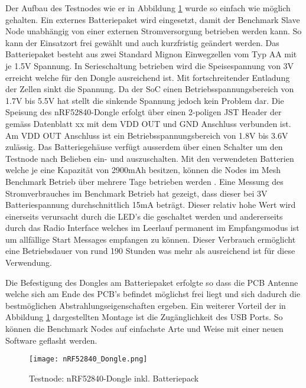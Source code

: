 Der Aufbau des Testnodes wie er in Abbildung \ref{fig:TestnodenRF52840-DongleinklBatteriepack} wurde so einfach wie möglich gehalten. Ein externes Batteriepaket wird eingesetzt, damit der Benchmark Slave Node unabhängig von einer externen Stromversorgung betrieben werden kann. So kann der Einsatzort frei gewählt und auch kurzfristig geändert werden.
Das Batteriepaket besteht aus zwei Standard Mignon Einwegzellen vom Typ AA mit je 1.5V Spannung. In Serieschaltung betrieben wird die Speisespannung von 3V erreicht welche für den Dongle ausreichend ist. Mit fortschreitender Entladung der Zellen sinkt die Spannung. Da der SoC einen Betriebsspannungsbereich von 1.7V bis 5.5V hat stellt die sinkende Spannung jedoch kein Problem dar.
Die Speisung des nRF52840-Dongle erfolgt über einen 2-poligen JST Header der gemäss Datenblatt xx mit dem VDD OUT und GND Anschluss verbunden ist. Am VDD OUT Anschluss ist ein Betriebsspannungsbereich von 1.8V bis 3.6V zulässig.
Das Batteriegehäuse verfügt ausserdem über einen Schalter um den Testnode nach Belieben ein- und auszuschalten.
Mit den verwendeten Batterien welche je eine Kapazität von 2900mAh besitzen, können die Nodes im Mesh Benchmark Betrieb über mehrere Tage betrieben werden \cite{distrelec_schweiz_ag_rnd_2020} .
Eine Messung des Stromverbrauches im Benchmark Betrieb hat gezeigt, dass dieser bei 3V Batteriespannung durchschnittlich 15mA beträgt. Dieser relativ hohe Wert wird einerseits verursacht durch die LED's die geschaltet werden und andererseits durch das Radio Interface welches im Leerlauf permanent im Empfangsmodus ist um allfällige Start Messages empfangen zu können. 
Dieser Verbrauch ermöglicht eine Betriebsdauer von rund 190 Stunden was mehr als ausreichend ist für diese Verwendung.

Die Befestigung des Dongles am Batteriepaket erfolgte so dass die PCB Antenne welche sich am Ende des PCB's befindet möglichst frei liegt und sich dadurch die bestmöglichen Abstrahlungseigenschaften ergeben. Ein weiterer Vorteil der in Abbildung \ref{fig:TestnodenRF52840-DongleinklBatteriepack} dargestellten Montage ist die Zugänglichkeit des USB Ports. So können die Benchmark Nodes auf einfachste Arte und Weise mit einer neuen Software geflasht werden.

 
\begin{figure} [H]
	\centering
	\texttt{[image: nRF52840\_Dongle.png]}
	\caption{Testnode: nRF52840-Dongle inkl. Batteriepack}
	\label{fig:TestnodenRF52840-DongleinklBatteriepack}
\end{figure}

